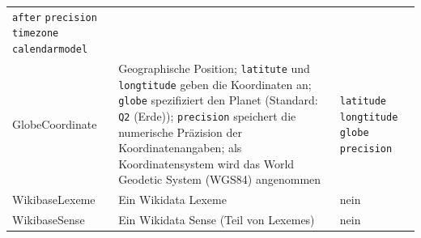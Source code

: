 \begin{table}
\begin{adjustwidth}{-1.5cm}{-0.5cm}
\begin{minipage}{\textwidth}
\begin{tabular}{l p{} p{}}
                                                                                                                                                                                         \verb|after|\newline{}
                                                                                                                                                                                         \verb|precision|\newline{}
                                                                                                                                                                                         \verb|timezone|\newline{}
                                                                                                                                                                                         \verb|calendarmodel| \\
      GlobeCoordinate  & Geographische Position; \verb|latitute| und \verb|longtitude| geben die Koordinaten an; \verb|globe| spezifiziert den Planet (Standard: \verb|Q2| (Erde));
                         \verb|precision| speichert die numerische Präzision der Koordinatenangaben; als Koordinatensystem wird das World Geodetic System (WGS84) angenommen           & \verb|latitude|\newline{}
                                                                                                                                                                                         \verb|longtitude|\newline{}
                                                                                                                                                                                         \verb|globe|\newline{}
                                                                                                                                                                                         \verb|precision| \\
      WikibaseLexeme   & Ein Wikidata Lexeme                                                                                                                                           & nein \\
      WikibaseSense    & Ein Wikidata Sense (Teil von Lexemes)                                                                                                                         & nein \\

\end{tabular}
\end{minipage}
\end{adjustwidth}
\end{table}
